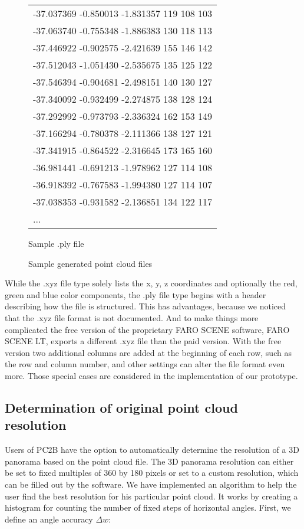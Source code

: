 \begin{figure}[h]
\begin{subtable}[b]{0.46\textwidth}
{\begin{tabular}{l}
			-37.037369 -0.850013 -1.831357 119 108 103 \\
			-37.063740 -0.755348 -1.886383 130 118 113 \\
			-37.446922 -0.902575 -2.421639 155 146 142 \\
			-37.512043 -1.051430 -2.535675 135 125 122 \\
			-37.546394 -0.904681 -2.498151 140 130 127 \\
			-37.340092 -0.932499 -2.274875 138 128 124 \\
			-37.292992 -0.973793 -2.336324 162 153 149 \\
			-37.166294 -0.780378 -2.111366 138 127 121 \\
			-37.341915 -0.864522 -2.316645 173 165 160 \\
			-36.981441 -0.691213 -1.978962 127 114 108 \\
			-36.918392 -0.767583 -1.994380 127 114 107 \\
			-37.038353 -0.931582 -2.136851 134 122 117 \\
			...
			
		\end{tabular}}
		\caption{Sample .ply file}
		\label{tab:ply_file}
	\end{subtable}
	\caption{Sample generated point cloud files}
	\label{fig:xyz_ply_file_structure}
\end{figure}

While the .xyz file type solely lists the x, y, z coordinates and optionally the red, green and blue color components, the .ply file type begins with a header describing how the file is structured. This has advantages, because we noticed that the .xyz file format is not documented. And to make things more complicated the free version of the proprietary FARO SCENE software, FARO SCENE LT, exports a different .xyz file than the paid version. With the free version two additional columns are added at the beginning of each row, such as the row and column number, and other settings can alter the file format even more. Those special cases are considered in the implementation of our prototype.


\subsection{Determination of original point cloud resolution}

Users of PC2B have the option to automatically determine the resolution of a 3D panorama based on the point cloud file. The 3D panorama resolution can either be set to fixed multiples of 360 by 180 pixels or set to a custom resolution, which can be filled out by the software. We have implemented an algorithm to help the user find the best resolution for his particular point cloud. It works by creating a histogram for counting the number of fixed steps of horizontal angles. First, we define an angle accuracy $\Delta{w}$:

